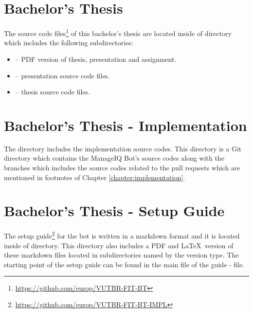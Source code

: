 \section{Bachelor's Thesis}\label{section:BT}

The source code files\footnote{\url{https://github.com/europ/VUTBR-FIT-BT}} of this bachelor's thesis are located inside of  directory which includes the following subdirectories:

\begin{itemize}

    \item {} -- PDF version of thesis, presentation and assignment.
    \item {} -- presentation source code files.
    \item {} -- thesis source code files.

\end{itemize}

\section{Bachelor's Thesis - Implementation}\label{section:BT-I}

The  directory includes the implementation source codes. This directory is a Git directory which contains the ManageIQ Bot's source codes along with the branches which includes the source codes related to the pull requests which are mentioned in footnotes of Chapter \ref{chapter:implementation}.

\section{Bachelor's Thesis - Setup Guide}\label{section:BT-SG}

The setup guide\footnote{\url{https://github.com/europ/VUTBR-FIT-BT-IMPL}} for the bot is written in a markdown format and it is located inside of  directory. This directory also includes a PDF and \LaTeX\ version of these markdown files located in subdirectories named by the version type. The starting point of the setup guide can be found in the main file of the guide -  file.
